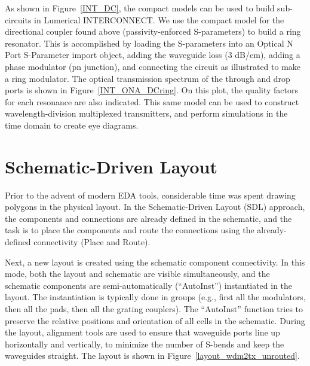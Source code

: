 \documentclass[journal]{spie}
\begin{document}
As shown in Figure~\ref{INT_DC}, the compact models can be used to build sub-circuits in Lumerical INTERCONNECT.  We use the compact model for the directional coupler found above (passivity-enforced S-parameters) to build a ring resonator.  This is accomplished by loading the S-parameters into an Optical N Port S-Parameter import object, adding the waveguide loss (3 dB/cm), adding a phase modulator (pn junction), and connecting the circuit as illustrated to make a ring modulator.    The optical transmission spectrum of the through and drop ports is shown in Figure~\ref{INT_ONA_DCring}.  On this plot, the quality factors for each resonance are also indicated.  This same model can be used to construct wavelength-division multiplexed transmitters, and perform simulations in the time domain to create eye diagrams.




\section{Schematic-Driven Layout}    

Prior to the advent of modern EDA tools, considerable time was spent drawing polygons in the physical layout.  In the Schematic-Driven Layout (SDL) approach, the components and connections are already defined in the schematic, and the task is to  place the components and route the connections using the already-defined connectivity (Place and Route).  

Next, a new layout is created using the schematic component connectivity.  In this mode, both the layout and schematic are visible simultaneously, and the schematic components are semi-automatically (``AutoInst'') instantiated in the layout.  The instantiation is typically done in groups (e.g., first all the modulators, then all the pads, then all the grating couplers).  The ``AutoInst'' function tries to preserve the relative positions and orientation of all cells in the schematic.  During the layout, alignment tools are used to ensure that waveguide ports line up horizontally and vertically, to minimize the number of S-bends and keep the waveguides straight.  The layout is shown in Figure~\ref{layout_wdm2tx_unrouted}.
\end{document}
